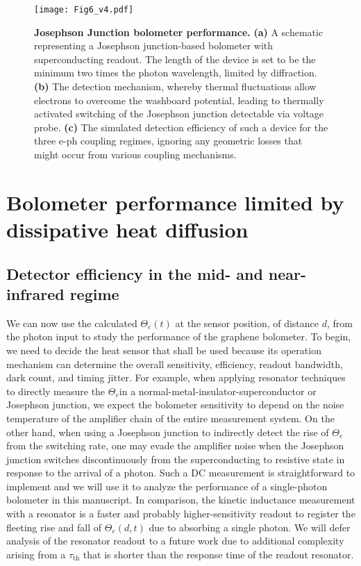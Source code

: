 \documentclass[aip, amsmath,amssymb, reprint]{revtex4-1}
\begin{document}
\begin{figure}[h]\centering
\texttt{[image: Fig6\_v4.pdf]}
\caption{\textbf{Josephson Junction bolometer performance.} \textbf{(a)} A schematic representing a Josephson junction-based bolometer with superconducting readout. The length of the device is set to be the minimum two times the photon wavelength, limited by diffraction. \textbf{(b)} The detection mechanism, whereby thermal fluctuations allow electrons to overcome the washboard potential, leading to thermally activated switching of the Josephson junction detectable via voltage probe.  \textbf{(c)} The simulated detection efficiency of such a device for the three e-ph coupling regimes, ignoring any geometric losses that might occur from various coupling mechanisms.}
\label{fig:efficiency}
\end{figure}

\section{Bolometer performance limited by dissipative heat diffusion}\label{sec:performance}

\subsection{Detector efficiency in the mid- and near-infrared regime}

We can now use the calculated $\Theta_e(t)$ at the sensor position, of distance $d$, from the photon input to study the performance of the graphene bolometer. To begin, we need to decide the heat sensor that shall be used because its operation mechanism can determine the overall sensitivity, efficiency, readout bandwidth, dark count, and timing jitter. For example, when applying resonator techniques to directly measure the $\Theta_e$in a normal-metal-insulator-superconductor\cite{Gasparinetti.2015} or Josephson junction\cite{Zgirski.2018}, we expect the bolometer sensitivity to depend on the noise temperature of the amplifier chain of the entire measurement system. On the other hand, when using a Josephson junction to indirectly detect the rise of $\Theta_e$ from the switching rate\cite{Walsh.2017,Walsh.2021}, one may evade the amplifier noise when the Josephson junction switches discontinuously from the superconducting to resistive state in response to the arrival of a photon. Such a DC measurement is straightforward to implement and we will use it to analyze the performance of a single-photon bolometer in this manuscript. In comparison, the kinetic inductance measurement\cite{Giazotto.2008} with a resonator is a faster and probably higher-sensitivity readout to register the fleeting rise and fall of $\Theta_e(d, t)$ due to absorbing a single photon. We will defer analysis of the resonator readout to a future work due to additional complexity arising from a $\tau_{\text{th}}$ that is shorter than the response time of the readout resonator.
\end{document}
